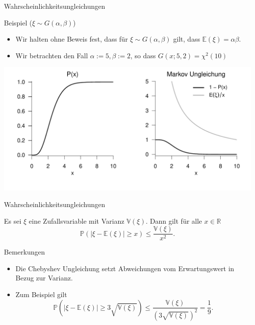 \documentclass[
  8pt,
  ignorenonframetext,
]{beamer}
\providecommand{\tightlist}{%
  \setlength{\itemsep}{0pt}\setlength{\parskip}{0pt}}
\begin{document}
\begin{frame}{Wahrscheinlichkeitsungleichungen}
\protect\hypertarget{wahrscheinlichkeitsungleichungen-2}{}
\small

Beispiel (\(\xi \sim G(\alpha,\beta)\)) \vspace{1mm} \small

\begin{itemize}
\item Wir halten ohne Beweis fest, dass für $\xi \sim G(\alpha,\beta)$ gilt, dass $\mathbb{E}(\xi) = \alpha\beta$.
\item Wir betrachten den Fall $\alpha := 5, \beta := 2$, so dass $G(x;5,2) = \chi^2(10)$
\end{itemize}

\begin{center}\includegraphics[width=0.95\linewidth]{7_Abbildungen/wtfi_7_markov_ungleichung} \end{center}
\end{frame}

\begin{frame}{Wahrscheinlichkeitsungleichungen}
\protect\hypertarget{wahrscheinlichkeitsungleichungen-3}{}
\small
\begin{theorem}
\justifying
\normalfont
Es sei $\xi$ eine Zufallsvariable mit Varianz $\mathbb{V}(\xi)$. Dann gilt für alle $x \in \mathbb{R}$
\begin{equation}
\mathbb{P}(|\xi - \mathbb{E}(\xi)| \ge x) \le \frac{\mathbb{V}(\xi)}{x^2}.
\end{equation}
\end{theorem}

Bemerkungen

\begin{itemize}
\tightlist
\item
  Die Chebyshev Ungleichung setzt Abweichungen vom Erwartungswert in
  Bezug zur Varianz.
\item
  Zum Beispiel gilt \begin{equation}
  \mathbb{P}\left(|\xi - \mathbb{E}(\xi)| \ge 3 \sqrt{\mathbb{V}(\xi)}\right)
  \le  \frac{\mathbb{V}(\xi)}{\left(3 \sqrt{\mathbb{V}(\xi)}\right)^2} =
  \frac{1}{9}.
  \end{equation}
\end{itemize}
\end{frame}
\end{document}
